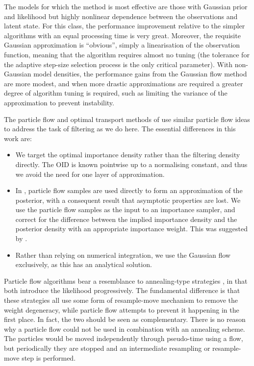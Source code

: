 \documentclass{article}
\begin{document}
The models for which the method is most effective are those with Gaussian prior and likelihood but highly nonlinear dependence between the observations and latent state. For this class, the performance improvement relative to the simpler algorithms with an equal processing time is very great. Moreover, the requisite Gaussian approximation is ``obvious'', simply a linearisation of the observation function, meaning that the algorithm requires almost no tuning (the tolerance for the adaptive step-size selection process is the only critical parameter). With non-Gaussian model densities, the performance gains from the Gaussian flow method are more modest, and when more drastic approximations are required a greater degree of algorithm tuning is required, such as limiting the variance of the approximation to prevent instability.

The particle flow and optimal transport methods of \citep{Daum2008,Daum2011d,Reich2011,Reich2012a} use similar particle flow ideas to address the task of filtering as we do here. The essential differences in this work are:
%
\begin{itemize}
  \item We target the optimal importance density rather than the filtering density directly. The OID is known pointwise up to a normalising constant, and thus we avoid the need for one layer of approximation.
  \item In \citep{Daum2008,Daum2011d,Reich2011,Reich2012a}, particle flow samples are used directly to form an approximation of the posterior, with a consequent result that asymptotic properties are lost. We use the particle flow samples as the input to an importance sampler, and correct for the difference between the implied importance density and the posterior density with an appropriate importance weight. This was suggested by \cite{Reich2012}.
  \item Rather than relying on numerical integration, we use the Gaussian flow exclusively, as this has an analytical solution.
\end{itemize}

Particle flow algorithms bear a resemblance to annealing-type strategies \citep{Neal2001,Deutscher2000,Gall2007,DelMoral2006,Godsill2001b,Oudjane2000}, in that both introduce the likelihood progressively. The fundamental difference is that these strategies all use some form of resample-move mechanism to remove the weight degeneracy, while particle flow attempts to prevent it happening in the first place. In fact, the two should be seen as complementary. There is no reason why a particle flow could not be used in combination with an annealing scheme. The particles would be moved independently through pseudo-time using a flow, but periodically they are stopped and an intermediate resampling or resample-move step is performed.
\end{document}
